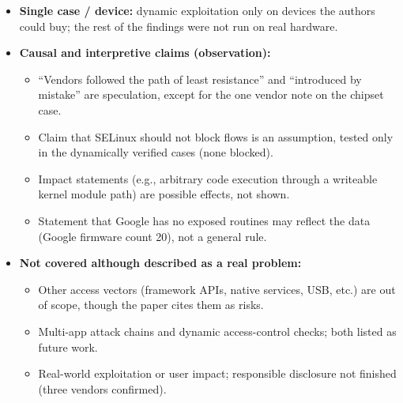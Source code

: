 \documentclass[11pt,a4paper]{article}
\begin{document}
\begin{enumerate}
\begin{itemize}[leftmargin=*, itemsep=1pt, topsep=2pt]
\begin{itemize}[itemsep=0pt]
        \end{itemize}
        \item \textbf{Single case / device:} dynamic exploitation only on devices the authors could buy; the rest of the findings were not run on real hardware.
        \item \textbf{Causal and interpretive claims (observation):}
        \begin{itemize}[itemsep=0pt]
            \item ``Vendors followed the path of least resistance'' and ``introduced by mistake'' are speculation, except for the one vendor note on the chipset case.
            \item Claim that SELinux should not block flows is an assumption, tested only in the dynamically verified cases (none blocked).
            \item Impact statements (e.g., arbitrary code execution through a writeable kernel module path) are possible effects, not shown.
            \item Statement that Google has no exposed routines may reflect the data (Google firmware count 20), not a general rule.
        \end{itemize}
        \item \textbf{Not covered although described as a real problem:}
        \begin{itemize}[itemsep=0pt]
            \item Other access vectors (framework APIs, native services, USB, etc.) are out of scope, though the paper cites them as risks.
            \item Multi-app attack chains and dynamic access-control checks; both listed as future work.
            \item Real-world exploitation or user impact; responsible disclosure not finished (three vendors confirmed).
        \end{itemize}
    \end{itemize}


\end{enumerate}
\end{document}
